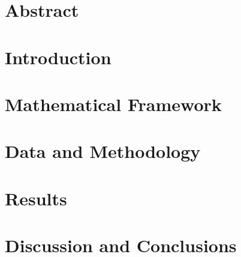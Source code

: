 \documentclass[12pt, oneside]{report}
\begin{document}


\makeunipdtitlepage%

\clearpage
\thispagestyle{plain}
\null%
\clearpage

\chapter*{Abstract}

\clearpage
\tableofcontents
\clearpage



\chapter{Introduction}

\clearpage

\chapter{Mathematical Framework}

\clearpage

\chapter{Data and Methodology}

\clearpage

\chapter{Results}

\clearpage

\chapter{Discussion and Conclusions}

\clearpage
\end{document}

